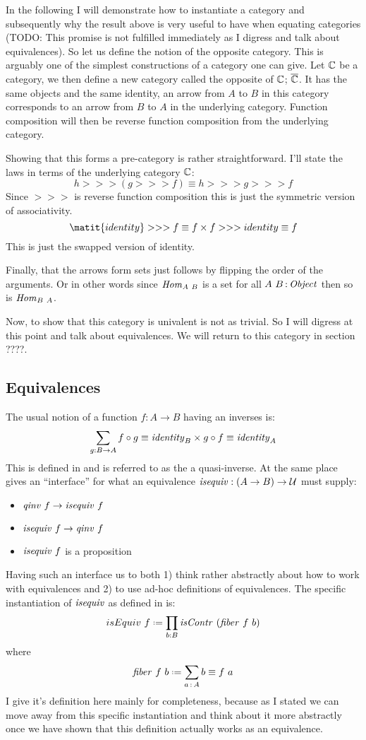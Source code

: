 In the following I will demonstrate how to instantiate a category and
subsequently why the result above is very useful to have when equating
categories (TODO: This promise is not fulfilled immediately as I digress and
talk about equivalences). So let us define the notion of the opposite category.
This is arguably one of the simplest constructions of a category one can give.
Let $\mathbb{C}$ be a category, we then define a new category called the opposite of
$\mathbb{C}$; $\overline{\mathbb{C}}$. It has the same objects and the same identity, an arrow
from $A$ to $B$ in this category corresponds to an arrow from $B$ to $A$ in the
underlying category. Function composition will then be reverse function
composition from the underlying category.

Showing that this forms a pre-category is rather straightforward. I'll state the
laws in terms of the underlying category $\mathbb{C}$:
%
$$
h >>> (g >>> f) \equiv h >>> g >>> f
$$
%
Since $>>>$ is reverse function composition this is just the symmetric version
of associativity.
%
$$
\matit{identity} >>> f \equiv f \x f >>> identity \equiv f
$$
This is just the swapped version of identity.

Finally, that the arrows form sets just follows by flipping the order of the
arguments. Or in other words since $\mathit{Hom}_{A\ B}$ is a set for all $A\ B \,\mathord{:}\,
\mathit{Object}$ then so is $\Hom_{B\ A}$.

Now, to show that this category is univalent is not as trivial. So I will
digress at this point and talk about equivalences. We will return to this category in section ????.

\subsection{Equivalences}
The usual notion of a function $f : A \to B$ having an inverses is:
%
$$
\sum_{g : B \to A} f \circ g \equiv \mathit{identity}_{B} \times g \circ f \equiv \mathit{identity}_{A}
$$
%
This is defined in \cite[p. 129]{hott-2013} and is referred to as the a
quasi-inverse. At the same place \cite{hott-2013} gives an ``interface'' for
what an equivalence $\mathit{isequiv} : (A \to B) \to \mathcal{U}$ must supply:
%
\begin{itemize}
\item
  $\qinv\ f \to \isequiv\ f$
\item
  $\isequiv\ f \to \qinv\ f$
\item
  $\mathit{isequiv}\ f$ is a proposition
\end{itemize}
%
Having such an interface us to both 1) think rather abstractly about how to work
with equivalences and 2) to use ad-hoc definitions of equivalences. The specific
instantiation of $\mathit{isequiv}$ as defined in \cite{cubical} is:
%
$$
isEquiv\ f \defeq \prod_{b : B} \isContr\ (\fiber\ f\ b)
$$
where
$$
\fiber\ f\ b \defeq \sum_{a \tp A} b \equiv f\ a
$$
%
I give it's definition here mainly for completeness, because as I stated we can
move away from this specific instantiation and think about it more abstractly
once we have shown that this definition actually works as an equivalence.

